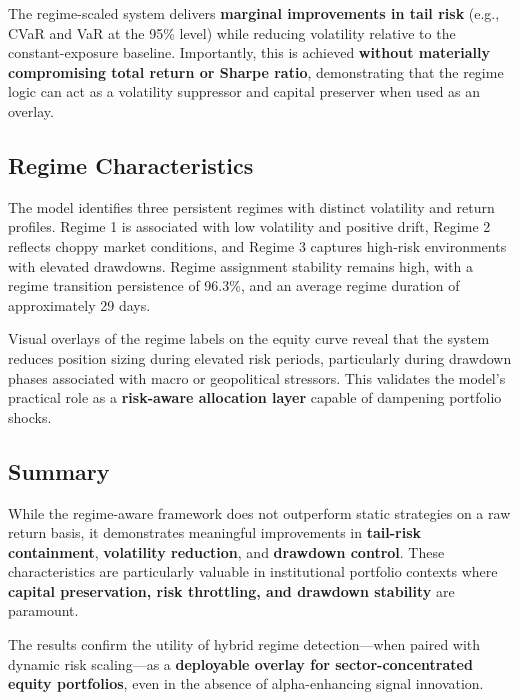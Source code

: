 The regime-scaled system delivers \textbf{marginal improvements in tail risk} (e.g., CVaR and VaR at the 95\% level) while reducing volatility relative to the constant-exposure baseline. Importantly, this is achieved \textbf{without materially compromising total return or Sharpe ratio}, demonstrating that the regime logic can act as a volatility suppressor and capital preserver when used as an overlay.

\subsection{Regime Characteristics}

The model identifies three persistent regimes with distinct volatility and return profiles. Regime 1 is associated with low volatility and positive drift, Regime 2 reflects choppy market conditions, and Regime 3 captures high-risk environments with elevated drawdowns. Regime assignment stability remains high, with a regime transition persistence of 96.3\%, and an average regime duration of approximately 29 days.

Visual overlays of the regime labels on the equity curve reveal that the system reduces position sizing during elevated risk periods, particularly during drawdown phases associated with macro or geopolitical stressors. This validates the model’s practical role as a \textbf{risk-aware allocation layer} capable of dampening portfolio shocks.

\subsection{Summary}

While the regime-aware framework does not outperform static strategies on a raw return basis, it demonstrates meaningful improvements in \textbf{tail-risk containment}, \textbf{volatility reduction}, and \textbf{drawdown control}. These characteristics are particularly valuable in institutional portfolio contexts where \textbf{capital preservation, risk throttling, and drawdown stability} are paramount.

The results confirm the utility of hybrid regime detection—when paired with dynamic risk scaling—as a \textbf{deployable overlay for sector-concentrated equity portfolios}, even in the absence of alpha-enhancing signal innovation.

